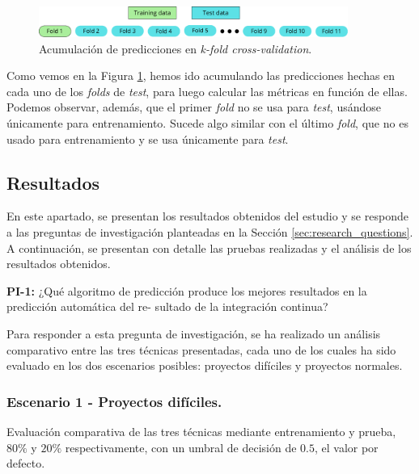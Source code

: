 \begin{figure}[H]
    \centering
    \includegraphics[width=0.9\textwidth]{images/Folds predictions.pdf}
    \caption{Acumulación de predicciones en \textit{k-fold cross-validation}.}
    \label{fig:fold-predictions}
\end{figure}

Como vemos en la Figura \ref{fig:fold-predictions}, hemos ido acumulando las predicciones hechas
en cada uno de los \textit{folds} de \textit{test}, para luego calcular las métricas en función
de ellas. Podemos observar, además, que el primer \textit{fold} no se usa para \textit{test},
usándose únicamente para entrenamiento. Sucede algo similar con el último \textit{fold}, que no
es usado para entrenamiento y se usa únicamente para \textit{test}.\\

\subsection{Resultados}
En este apartado, se presentan los resultados obtenidos del estudio y se responde a las
preguntas de investigación planteadas en la Sección \ref{sec:research_questions}. A continuación,
se presentan con detalle las pruebas realizadas y el análisis de los resultados obtenidos.\\

\begin{mdframed}[backgroundcolor=gray!10,linewidth=0.5pt,roundcorner=1pt]
    \textbf{PI-1:} ¿Qué algoritmo de predicción produce los mejores resultados en la predicción automática del re-
    sultado de la integración continua?
\end{mdframed}

Para responder a esta pregunta de investigación, se ha realizado un análisis comparativo entre
las tres técnicas presentadas, cada uno de los cuales ha sido evaluado en los dos escenarios
posibles: proyectos difíciles y proyectos normales. 

\subsubsection{Escenario 1 - Proyectos difíciles.} Evaluación comparativa de las tres técnicas
mediante entrenamiento y prueba, $80\%$ y $20\%$ respectivamente, con un umbral de decisión
de $0.5$, el valor por defecto.\\

